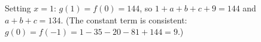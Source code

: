 Setting $x=1$: $g(1)=f(0)=144$, so $1+a+b+c+9=144$ and $a+b+c=\boxed{134}$. (The constant term is consistent: $g(0)=f(-1)=1-35-20-81+144=9$.)
